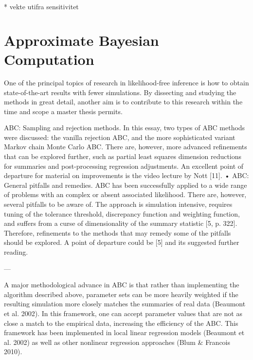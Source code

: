 * vekte utifra sensitivitet

\section{Approximate Bayesian Computation}

One of the principal topics of research in likelihood-free inference is how to obtain state-of-the-art results with fewer simulations. By dissecting and studying the methods in great detail, another aim is to contribute to this research within the time and scope a master thesis permits. 

ABC: Sampling and rejection methods. In this essay, two types of ABC methods were discussed: the vanilla rejection ABC, and the more sophisticated variant Markov chain Monte Carlo ABC. There are, however, more advanced refinements that can be explored further, such as partial least squares dimension reductions for summaries and post-processing regression adjustments. An excellent point of departure for material on improvements is the video lecture by Nott [11].
• ABC: General pitfalls and remedies. ABC has been successfully applied to a wide range of problems with an complex or absent associated likelihood. There are, however, several pitfalls to be aware of. The approach is simulation intensive, requires tuning of the tolerance threshold, discrepancy function and weighting function, and suffers from a curse of dimensionality of the summary statistic [5, p. 322]. Therefore, refinements to the methods that may remedy some of the pitfalls should be explored. A point of departure could be [5] and its suggested further reading. 

---

A major methodological advance in ABC is that rather than implementing the algorithm described above, parameter sets can be more heavily weighted if the resulting simulation more closely matches the summaries of real data (Beaumont et al. 2002). In this framework, one can accept parameter values that are not as close a match to the empirical data, increasing the efficiency of the ABC. This framework has been implemented in local linear regression models (Beaumont et al. 2002) as well as other nonlinear regression approaches (Blum \& Francois 2010). 

